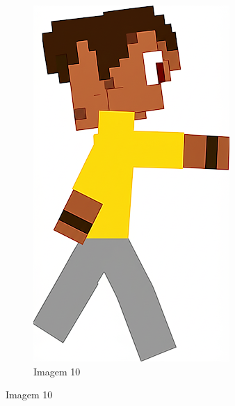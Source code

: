 \begin{figure}[htbp]
\begin{subfigure}{0.23\linewidth}
        \includegraphics[width=1\linewidth]{figs/geminiPro/chat10/tela1_res2_10.PNG}
        \caption{\small Imagem 10}
        \label{fig:geminiProSheet5_2j}
    \end{subfigure}

\end{figure}

